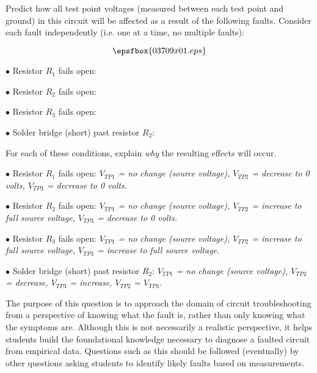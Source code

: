 

Predict how all test point voltages (measured between each test point and ground) in this circuit will be affected as a result of the following faults.  Consider each fault independently (i.e. one at a time, no multiple faults):

$$\epsfbox{03709x01.eps}$$

\medskip
\item{$\bullet$} Resistor $R_1$ fails open:
\vskip 5pt
\item{$\bullet$} Resistor $R_2$ fails open:
\vskip 5pt
\item{$\bullet$} Resistor $R_3$ fails open:
\vskip 5pt
\item{$\bullet$} Solder bridge (short) past resistor $R_2$:
\medskip

For each of these conditions, explain {\it why} the resulting effects will occur.







\medskip
\item{$\bullet$} Resistor $R_1$ fails open: {\it $V_{TP1}$ = no change (source voltage), $V_{TP2}$ = decrease to 0 volts, $V_{TP3}$ = decrease to 0 volts.}
\vskip 5pt
\item{$\bullet$} Resistor $R_2$ fails open: {\it $V_{TP1}$ = no change (source voltage), $V_{TP2}$ = increase to full source voltage, $V_{TP3}$ = decrease to 0 volts.}
\vskip 5pt
\item{$\bullet$} Resistor $R_3$ fails open: {\it $V_{TP1}$ = no change (source voltage), $V_{TP2}$ = increase to full source voltage, $V_{TP3}$ = increase to full source voltage.}
\vskip 5pt
\item{$\bullet$} Solder bridge (short) past resistor $R_2$: {\it $V_{TP1}$ = no change (source voltage), $V_{TP2}$ = decrease, $V_{TP3}$ = increase, $V_{TP2}$ = $V_{TP3}$.}
\medskip







The purpose of this question is to approach the domain of circuit troubleshooting from a perspective of knowing what the fault is, rather than only knowing what the symptoms are.  Although this is not necessarily a realistic perspective, it helps students build the foundational knowledge necessary to diagnose a faulted circuit from empirical data.  Questions such as this should be followed (eventually) by other questions asking students to identify likely faults based on measurements.




